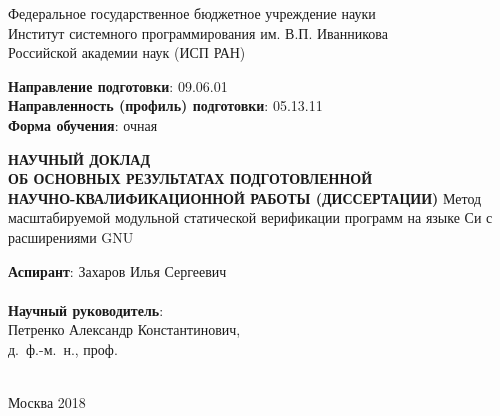 \documentclass[%
candidate,     %
href,        %
colorlinks,  %
]{disser}
\begin{document}

\thispagestyle{empty}
\begin{center}
\large{
Федеральное государственное бюджетное учреждение науки \\ Институт системного программирования им. В.П. Иванникова \\ Российской академии наук (ИСП РАН)}
\end{center}
\vspace{8mm}
\begin{flushleft}
\textbf{Направление подготовки}: 09.06.01\\
\textbf{Направленность (профиль) подготовки}: 05.13.11\\
\textbf{Форма обучения}: очная\\
\end{flushleft}
\vspace{10mm}
\begin{center}
\textbf{
НАУЧНЫЙ ДОКЛАД\\
ОБ ОСНОВНЫХ РЕЗУЛЬТАТАХ ПОДГОТОВЛЕННОЙ\\
НАУЧНО-КВАЛИФИКАЦИОННОЙ РАБОТЫ (ДИССЕРТАЦИИ)}
Метод масштабируемой модульной статической верификации программ на языке Си с расширениями GNU
\end{center}
\vspace{10mm}
\begin{flushleft}
\hspace*{.5\linewidth}\textbf{Аспирант}: Захаров Илья Сергеевич\\
\hspace*{.5\linewidth}\hrulefill\\
\hspace*{.5\linewidth}\textbf{Научный руководитель}:\\
\hspace*{.5\linewidth}Петренко Александр Константинович,\\
\hspace*{.5\linewidth}д.~ф.-м.~н., проф.\\
\hspace*{.5\linewidth}\hrulefill\\
\end{flushleft}
\vspace{15mm}
\begin{center}
Москва 2018
\end{center}
\clearpage

\end{document}
